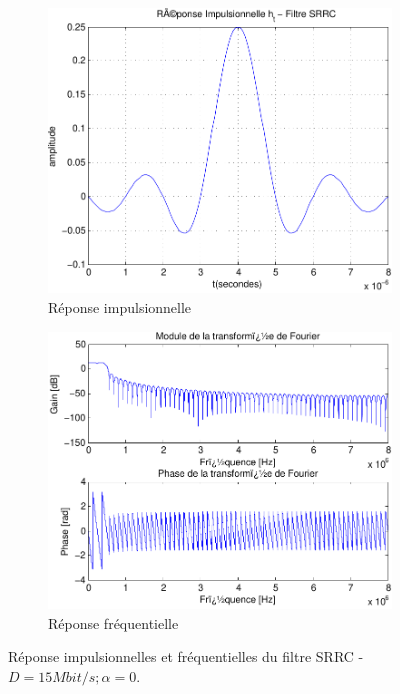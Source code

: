 \documentclass[a4paper,11pt]{article}
\begin{document}
\begin{figure}[htb]
	\begin{subfigure}{.5\textwidth}
  		\centering
  		\includegraphics[width=1\linewidth]{impul_srrc_alpha_0-crop.pdf}
  		\caption{Réponse impulsionnelle}
  		\label{fig:srrc_impul15M_alp0}
	\end{subfigure}
	\begin{subfigure}{.5\textwidth}
  		\centering
  		\includegraphics[width=1\linewidth]{frec_srrc_alpha_0-crop.pdf}
  		\caption{Réponse fréquentielle}
  		\label{fig:srrc_frec15M_alp0}
	\end{subfigure}%
	\caption{Réponse impulsionnelles et fréquentielles du filtre SRRC - $D=15 Mbit/s ; \alpha =0$.}
	\label{fig:srrc15M_alp0}
\end{figure}
\end{document}
